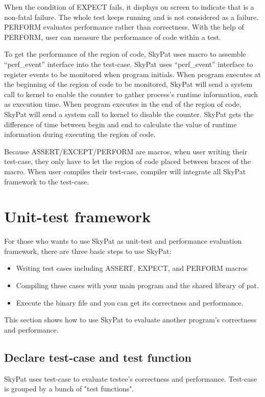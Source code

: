 \documentclass[final]{ols}
\begin{document}
When the condition of EXPECT fails, it displays on screen to indicate that is a non-fatal failure. The whole test keeps running and is not considered as a failure.
PERFORM evaluates performance rather than correctness. With the help of PERFORM, user can measure the performance of code within a test.

To get the performance of the region of code, SkyPat uses macro to assemble ``perf\_event'' interface into the test-case.
SkyPat uses ``perf\_event'' interface to register events to be monitored when program initials.
When program executes at the beginning of the region of code to be monitored, SkyPat will send a system call to kernel to enable the counter to gather process's runtime information, such as execution time.
When program executes in the end of the region of code, SkyPat will send a system call to kernel to disable the counter.
SkyPat gets the difference of time between begin and end to calculate the value of runtime information during executing the region of code.

Because ASSERT/EXCEPT/PERFORM are macros, when user writing their test-case, they only have to let the region of code placed between braces of the macro.
When user compiles their test-case, compiler will integrate all SkyPat framework to the test-case.

\section{Unit-test framework}
For those who wants to use SkyPat as unit-test and performance evaluation framework, there are three basic steps to use SkyPat:
\begin{itemize}
\item Writing test cases including ASSERT, EXPECT, and PERFORM macros
\item Compiling these cases with your main program and the shared library of pat.
\item Execute the binary file and you can get its correctness and performance.
\end{itemize}
This section shows how to use SkyPat to evaluate another program's correctness and performance.

\subsection{Declare test-case and test function}

SkyPat uses test-case to evaluate testee's correctness and performance. 
Test-case is grouped by a bunch of "test functions".
\end{document}
